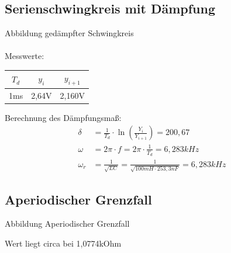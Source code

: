 \documentclass{article}
\begin{document}
\subsection{Serienschwingkreis mit Dämpfung}

Abbildung gedämpfter Schwingkreis\\\\

Messwerte:
\begin{table}[h]
  \begin{center}

    \begin{tabular}{|c|c|c|}
      \hline
      $T_d$ & $y_i$ & $y_{i+1}$ \\
      \hline
      1ms   & 2,64V & 2,160V    \\
      \hline
    \end{tabular}
  \end{center}
\end{table}
Berechnung des Dämpfungsmaß:
\begin{align*}
  \delta   & = \frac{1}{T_d} \cdot \ln \left(\frac{Y_i}{Y_{i+1}}\right) = 200,67      \\
  \omega   & = 2\pi \cdot f = 2\pi \cdot \frac{1}{T_d} = 6,283kHz                     \\
  \omega_r & = \frac{1}{\sqrt{LC}} = \frac{1}{\sqrt{100mH \cdot 253,3nF}} = 6,283 kHz
\end{align*}


\subsection{Aperiodischer Grenzfall}

Abbildung Aperiodischer Grenzfall

Wert liegt circa bei 1,0774kOhm
\end{document}
